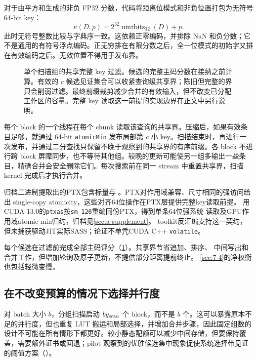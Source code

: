 对于由平方和生成的非负 FP32 分数，代码将距离位模式和非负位置打包为无符号 64-bit key：
\begin{equation}
 \kappa(D,p)=2^{32}\operatorname{uintbits}_{32}(D)+p.
 \label{eq:5-packed-key}
\end{equation}
此时无符号整数比较与字典序一致。这依赖正零编码，并排除 NaN 和负分数；它不是通用的有符号浮点编码。正无穷排在有限分数之后，全一位模式的初始字又排在有效编码之后。无效位置不得用于发布界。

\begin{figure}[tbp]
\centering

\caption[共享完整键过滤]{单个扫描组的共享完整 key 过滤。候选的完整主码分数在接纳之前计算。有效的 $c$ 候选见证集合可以收紧查询级共享界；陈旧但完整的界只会削弱过滤。最终前缀裁剪减少合并的有效输入，但不改变已分配工作区的容量。完整 key 读取这一前提的实现边界在正文中另行说明。}
\label{fig:5-shared-bound}
\end{figure}

每个 block 的一个线程在每个 chunk 读取该查询的共享界。压缩后，如果有效条目足够，就通过 64-bit \texttt{atomicMin} 发布局部第 $c$ 小 key。扫描结束时，再进行一次发布，并通过二分查找只保留不晚于观察到的共享界的有序前缀。各 block 不进行跨 block 屏障同步，也不等待其他组。较晚的更新可能使另一组多输出一些条目，精确合并会安全删除它们。每次搜索前在同一 stream 中重置共享界，扫描 kernel 完成后才执行合并。

归档二进制提取出的PTX包含标量与
。PTX对作用域兼容、尺寸相同的强访问给出
single-copy atomicity\cite{ptx_isa}，这些对齐64位操作在PTX层提供完整key读取前提。
用CUDA 13.0的\texttt{ptxas}按\texttt{sm\_120}重编同份PTX，得到单条64位强系统
读取及GPU作用域atomic-min归约，归档见\cref{sec:a-supplement}。
toolkit反汇编支持这一契约，但未捕获驱动JIT实际SASS；论证不单凭CUDA C++
\texttt{volatile}\cite{cuda_programming_guide}。

每个候选在过滤前完成全部主码评分（\cref{fig:5-shared-bound}）。共享界节省追加、排序、
中间写出和合并工作，但增加轮询及原子更新，不提供部分距离提前终止。
\cref{sec:7-4}的净权衡也包括轻微变慢。

\subsection{在不改变预算的情况下选择并行度}

对 batch 大小 $b$，分组扫描启动 $bg_{\mathrm{scan}}$ 个 block，而不是 $b$ 个。这可以暴露原本不足的并行度，但也重复 LUT 搬运和局部选择，并增加合并步骤，因此固定组数的设计不可能在所有情形下都更好。较小静态配额可以减少中间存储，但要保持覆盖，需要额外证书或回退；pilot 观察到的优胜候选集中现象促使系统选择带见证的阈值方案（）。

